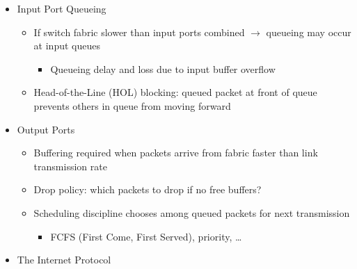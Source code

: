 \begin{itemize}
\begin{itemize}
\begin{itemize}
\begin{itemize}
            \end{itemize}

        \end{itemize}

    \end{itemize}

  \item Input Port Queueing

    \begin{itemize}

      \item If switch fabric slower than input ports combined $\to$ queueing may occur at input queues

        \begin{itemize}

          \item Queueing delay and loss due to input buffer overflow

        \end{itemize}

      \item Head-of-the-Line (HOL) blocking: queued packet at front of queue prevents others in queue from moving forward

    \end{itemize}

  \item Output Ports

    \begin{itemize}

      \item Buffering required when packets arrive from fabric faster than link transmission rate

      \item Drop policy: which packets to drop if no free buffers?

      \item Scheduling discipline chooses among queued packets for next transmission

        \begin{itemize}

          \item FCFS (First Come, First Served), priority, \ldots

        \end{itemize}

    \end{itemize}

  \item The Internet Protocol


\end{itemize}
